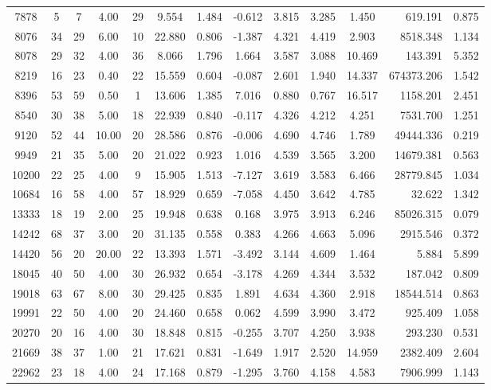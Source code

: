 \documentclass[mnsc]{informs3}
\begin{document}
\begin{APPENDICES}
\begin{longtable}{cccccccccccrc}
7878 & 5 & 7 & 4.00 & 29 & 9.554 & 1.484 & -0.612 & 3.815 & 3.285 & 1.450 & 619.191 & 0.875 \\
8076 & 34 & 29 & 6.00 & 10 & 22.880 & 0.806 & -1.387 & 4.321 & 4.419 & 2.903 & 8518.348 & 1.134 \\
8078 & 29 & 32 & 4.00 & 36 & 8.066 & 1.796 & 1.664 & 3.587 & 3.088 & 10.469 & 143.391 & 5.352 \\
8219 & 16 & 23 & 0.40 & 22 & 15.559 & 0.604 & -0.087 & 2.601 & 1.940 & 14.337 & 674373.206 & 1.542 \\
8396 & 53 & 59 & 0.50 & 1 & 13.606 & 1.385 & 7.016 & 0.880 & 0.767 & 16.517 & 1158.201 & 2.451 \\
8540 & 30 & 38 & 5.00 & 18 & 22.939 & 0.840 & -0.117 & 4.326 & 4.212 & 4.251 & 7531.700 & 1.251 \\
9120 & 52 & 44 & 10.00 & 20 & 28.586 & 0.876 & -0.006 & 4.690 & 4.746 & 1.789 & 49444.336 & 0.219 \\
9949 & 21 & 35 & 5.00 & 20 & 21.022 & 0.923 & 1.016 & 4.539 & 3.565 & 3.200 & 14679.381 & 0.563 \\
10200 & 22 & 25 & 4.00 & 9 & 15.905 & 1.513 & -7.127 & 3.619 & 3.583 & 6.466 & 28779.845 & 1.034 \\
10684 & 16 & 58 & 4.00 & 57 & 18.929 & 0.659 & -7.058 & 4.450 & 3.642 & 4.785 & 32.622 & 1.342 \\
13333 & 18 & 19 & 2.00 & 25 & 19.948 & 0.638 & 0.168 & 3.975 & 3.913 & 6.246 & 85026.315 & 0.079 \\
14242 & 68 & 37 & 3.00 & 20 & 31.135 & 0.558 & 0.383 & 4.266 & 4.663 & 5.096 & 2915.546 & 0.372 \\
14420 & 56 & 20 & 20.00 & 22 & 13.393 & 1.571 & -3.492 & 3.144 & 4.609 & 1.464 & 5.884 & 5.899 \\
18045 & 40 & 50 & 4.00 & 30 & 26.932 & 0.654 & -3.178 & 4.269 & 4.344 & 3.532 & 187.042 & 0.809 \\
19018 & 63 & 67 & 8.00 & 30 & 29.425 & 0.835 & 1.891 & 4.634 & 4.360 & 2.918 & 18544.514 & 0.863 \\
19991 & 22 & 50 & 4.00 & 20 & 24.460 & 0.658 & 0.062 & 4.599 & 3.990 & 3.472 & 925.409 & 1.058 \\
20270 & 20 & 16 & 4.00 & 30 & 18.848 & 0.815 & -0.255 & 3.707 & 4.250 & 3.938 & 293.230 & 0.531 \\
21669 & 38 & 37 & 1.00 & 21 & 17.621 & 0.831 & -1.649 & 1.917 & 2.520 & 14.959 & 2382.409 & 2.604 \\
22962 & 23 & 18 & 4.00 & 24 & 17.168 & 0.879 & -1.295 & 3.760 & 4.158 & 4.583 & 7906.999 & 1.143 \\

\end{longtable}
\end{APPENDICES}
\end{document}
